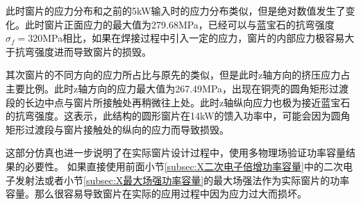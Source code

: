 \documentclass[master]{thesis-uestc}
\begin{document}
此时窗片的应力分布和之前的5kW输入时的应力分布类似，但是绝对数值发生了变化。此时窗片正面应力的最大值为279.68MPa，已经可以与蓝宝石的抗弯强度\(\sigma_f = 320\)MPa相比，如果在焊接过程中引入一定的应力，窗片的内部应力极容易大于抗弯强度进而导致窗片的损毁。

其次窗片的不同方向的应力所占比与原先的类似，但是此时z轴方向的挤压应力占主要比例。此时z轴方向的应力最大值为267.49MPa，出现在铜壳的圆角矩形过渡段的长边中点与窗片所接触处再稍微往上处。此时z轴纵向应力也极为接近蓝宝石的抗弯强度。这表示，此结构的圆形窗片在14kW的馈入功率中，可能会因为圆角矩形过渡段与窗片接触处的纵向的应力而导致损毁。

这部分仿真也进一步说明了在实际窗片设计过程中，使用多物理场验证功率容量结果的必要性。
如果直接使用前面小节\ref{subsec:X二次电子倍增功率容量}中的二次电子发射法或者小节\ref{subsec:X最大场强功率容量}的最大场强法作为实际窗片的功率容量。那么很容易导致窗片在实际的应用过程中因为应力过大而损坏。
\end{document}
